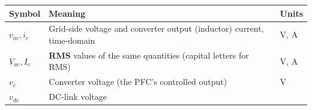 \documentclass[11pt]{article}
\begin{document}
\begin{longtable}[]{@{}lll@{}}
\toprule
\begin{minipage}[b]{0.30\columnwidth}\raggedright
Symbol\strut
\end{minipage} & \begin{minipage}[b]{0.34\columnwidth}\raggedright
Meaning\strut
\end{minipage} & \begin{minipage}[b]{0.27\columnwidth}\raggedright
Units\strut
\end{minipage}\tabularnewline
\midrule
\endhead
\begin{minipage}[t]{0.30\columnwidth}\raggedright
\(v_{ac}, i_c\)\strut
\end{minipage} & \begin{minipage}[t]{0.34\columnwidth}\raggedright
Grid-side voltage and converter output (inductor) current,
time-domain\strut
\end{minipage} & \begin{minipage}[t]{0.27\columnwidth}\raggedright
V, A\strut
\end{minipage}\tabularnewline
\begin{minipage}[t]{0.30\columnwidth}\raggedright
\(V_{ac}, I_c\)\strut
\end{minipage} & \begin{minipage}[t]{0.34\columnwidth}\raggedright
\textbf{RMS} values of the same quantities (capital letters for
RMS)\strut
\end{minipage} & \begin{minipage}[t]{0.27\columnwidth}\raggedright
V, A\strut
\end{minipage}\tabularnewline
\begin{minipage}[t]{0.30\columnwidth}\raggedright
\(v_c\)\strut
\end{minipage} & \begin{minipage}[t]{0.34\columnwidth}\raggedright
Converter voltage (the PFC's controlled output)\strut
\end{minipage} & \begin{minipage}[t]{0.27\columnwidth}\raggedright
V\strut
\end{minipage}\tabularnewline
\begin{minipage}[t]{0.30\columnwidth}\raggedright
\(v_{dc}\)\strut
\end{minipage} & \begin{minipage}[t]{0.34\columnwidth}\raggedright
DC-link voltage\strut
\end{minipage} & \begin{minipage}[t]{0.27\columnwidth}\raggedright

\end{minipage}
\end{longtable}
\end{document}
